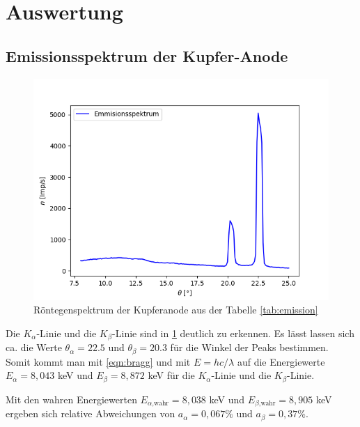\documentclass[titlepage = firstcover]{scrartcl}
\begin{document}
      \section{Auswertung}
        \subsection{Emissionsspektrum der Kupfer-Anode}
        \begin{figure}[h]
          \centering
          \includegraphics[width = 0.8\linewidth]{EmissionCu.png}
          \caption{Röntegenspektrum der Kupferanode aus der Tabelle \ref{tab:emission}}
          \label{fig:emission}
        \end{figure}
        \FloatBarrier
        
        Die $K_{\alpha}$-Linie und die $K_{\beta}$-Linie sind in \ref{fig:emission} deutlich zu erkennen. Es lässt lassen sich ca. die Werte $\theta_{\alpha} = 22.5$ und $\theta_{\beta} = 20.3$ für die Winkel der Peaks bestimmen. Somit kommt man mit \ref{eqn:bragg} und mit $E = hc/\lambda$ auf die Energiewerte $E_{\alpha} = 8,043$ keV und $E_{\beta} = 8,872$ keV für die $K_{\alpha}$-Linie und die $K_{\beta}$-Linie.

        Mit den wahren Energiewerten $E_{\alpha\text{,wahr}} = 8,038$ keV und $E_{\beta\text{,wahr}} = 8,905$ keV ergeben sich relative Abweichungen von $a_{\alpha} = 0,067\%$ und $a_{\beta} = 0,37\%$.
\end{document}

